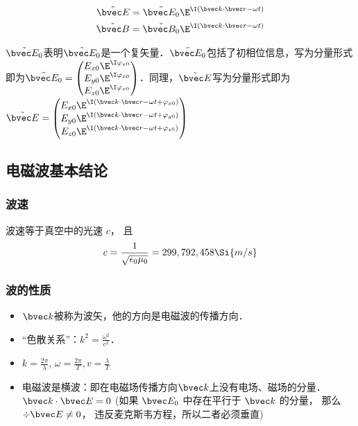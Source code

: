 \begin{align}
\tilde {\bvec E} = \tilde {\bvec E_0} \E^{\I(\bvec k \cdot \bvec r - \omega t)}\\
\tilde {\bvec B} = \tilde {\bvec B_0} \E^{\I(\bvec k \cdot \bvec r - \omega t)}\\
\end{align}

$\tilde {\bvec E_0}$表明$\tilde {\bvec E_0}$是一个复矢量．$\tilde {\bvec E_0}$包括了初相位信息，写为分量形式即为$
\tilde {\bvec E_0} = 
\begin{pmatrix}
E_{x0} \E^{\I\varphi_{x0}}\\
E_{y0} \E^{\I\varphi_{x0}}\\
E_{z0} \E^{\I\varphi_{x0}}\\
\end{pmatrix}
$．同理，$\tilde {\bvec E}$写为分量形式即为 
$\tilde {\bvec E} = 
\begin{pmatrix}
E_{x0} \E^{\I(\bvec k \cdot \bvec r - \omega t + \varphi_{x0})}\\
E_{y0} \E^{\I(\bvec k \cdot \bvec r - \omega t + \varphi_{y0})}\\
E_{z0} \E^{\I(\bvec k \cdot \bvec r - \omega t + \varphi_{z0})}\\
\end{pmatrix}
$
 

\subsection{电磁波基本结论}
\subsubsection{波速}
波速等于真空中的光速 $c$， 且
\begin{equation}\label{VcPlWv_eq1}
c = \frac{1}{\sqrt{\epsilon_0\mu_0}} = 299,792,458 \Si{m/s}
\end{equation}

\subsubsection{波的性质}
\begin{itemize}
\item $\bvec k$被称为波矢，他的方向是电磁波的传播方向．
\item  “色散关系”：$k^2=\frac{\omega^2}{c^2}$．
\item $k=\frac{2\pi}{\lambda}$, $\omega=\frac{2\pi}{T}, v=\frac{\lambda}{T}$
\item 电磁波是横波：即在电磁场传播方向$\bvec k$上没有电场、磁场的分量．$\bvec k \cdot \bvec E = 0$ (如果 $\bvec E_0$ 中存在平行于 $\bvec k$ 的分量， 那么 $\div \bvec E \ne 0$， 违反麦克斯韦方程，所以二者必须垂直)
\end{itemize}

